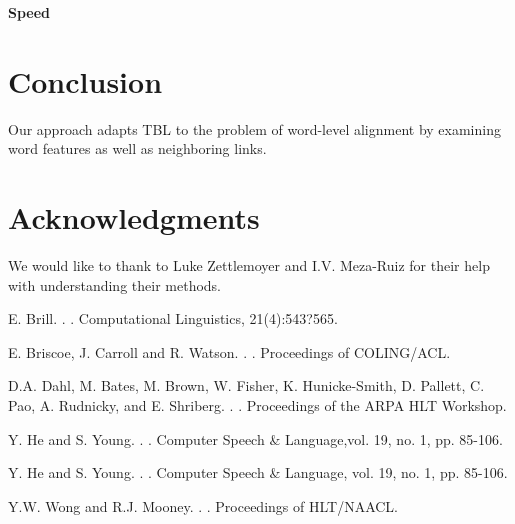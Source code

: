 \documentclass[11pt]{article}
\begin{document}
\textbf{Speed}

\section{Conclusion}

Our approach adapts TBL to the problem of
word-level alignment by examining word features
as well as neighboring links.
 
\section*{Acknowledgments}

We would like to thank to Luke Zettlemoyer and I.V. Meza-Ruiz for their help with understanding their methods.



\begin{thebibliography}{}

E. Brill.
.
.
\newblock Computational Linguistics, 21(4):543?565.

E. Briscoe, J. Carroll and R. Watson.
.
.
\newblock Proceedings of COLING/ACL.

D.A. Dahl, M. Bates, M. Brown, W. Fisher, K. Hunicke-Smith,
D. Pallett, C. Pao, A. Rudnicky, and E. Shriberg.
.
.
\newblock Proceedings of the ARPA HLT Workshop.

Y. He and S. Young.
.
.
\newblock Computer Speech \& Language,vol. 19, no. 1, pp. 85-106.

Y. He and S. Young.
.
.
\newblock Computer Speech \& Language, vol. 19, no. 1, pp. 85-106.

Y.W. Wong and R.J. Mooney.
.
.
\newblock Proceedings of HLT/NAACL.


\end{thebibliography}
\end{document}
